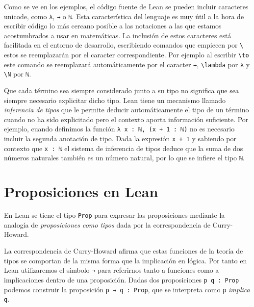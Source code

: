 
Como se ve en los ejemplos, el código fuente de Lean se pueden incluir
caracteres unicode, como \lstinline{λ}, \lstinline{→} o \lstinline{ℕ}. Esta
característica del lenguaje es muy útil a la hora de escribir código lo más
cercano posible a las notaciones a las que estamos acostumbrados a usar en
matemáticas. La inclusión de estos caracteres está facilitada en el entorno de
desarrollo, escribiendo comandos que empiecen por \texttt{\textbackslash} estos
se reemplazarán por el caracter correspondiente. Por ejemplo al escribir
\texttt{\textbackslash to} este comando se reemplazará automáticamente por el
caracter \lstinline{→}, \texttt{\textbackslash lambda} por \lstinline{λ} y
\texttt{\textbackslash N} por \lstinline{ℕ}.


Que cada término sea siempre considerado junto a su tipo no significa que sea
siempre necesario explicitar dicho tipo. Lean tiene un mecanismo llamado
\textit{inferencia de tipos} que le permite deducir automáticamente el tipo de
un término cuando no ha sido explicitado pero el contexto aporta información
suficiente.
Por ejemplo, cuando definimos la función \lstinline{λ x : ℕ, (x + 1 : ℕ)} no es
necesario incluir la segunda anotación de tipo. Dada la expresión
\lstinline{x + 1} y sabiendo por contexto que \lstinline{x : ℕ} el sistema de
inferencia de tipos deduce que la suma de dos números naturales también es un
número natural, por lo que se infiere el tipo \lstinline{ℕ}.

\section{Proposiciones en Lean}

En Lean se tiene el tipo \lstinline{Prop} para expresar las proposiciones
mediante la analogía de \textit{proposiciones como tipos} dada por la
correspondencia de Curry-Howard.

La correspondencia de Curry-Howard afirma que estas funciones de la
teoría de tipos se comportan de la misma forma que la implicación en lógica. Por
tanto en Lean utilizaremos el símbolo \lstinline{→} para referirnos tanto a
funciones como a implicaciones dentro de una proposición. Dadas dos
proposiciones \lstinline{p q : Prop} podemos construir la proposición
\lstinline{p → q : Prop}, que se interpreta como \lstinline{p} \textit{implica}
\lstinline{q}.



